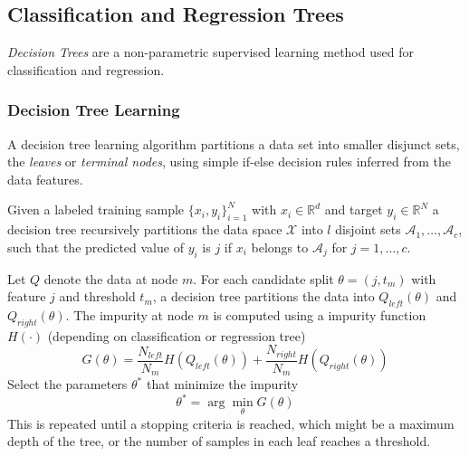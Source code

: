 \documentclass[11pt]{article}
\theoremstyle{plain}
\theoremstyle{definition}
\begin{document}
\subsection{Classification and Regression Trees}
\textit{Decision Trees} are a non-parametric supervised learning method used for classification and regression. 

\subsubsection{Decision Tree Learning}
A decision tree learning algorithm partitions a data set into smaller disjunct sets, the \textit{leaves} or \textit{terminal nodes}, using simple if-else decision rules inferred from the data features.

Given a labeled training sample $\{x_i,y_i\}_{i=1}^N$ with $x_i \in \mathbb{R}^d$ and target $y_i \in \mathbb{R}^N$ a decision tree recursively partitions the data space $\mathcal{X}$ into $l$ disjoint sets $\mathcal{A}_1, \dots,\mathcal{A}_c$, such that the predicted value of $y_i$ is $j$ if $x_i$ belongs to $\mathcal{A}_j$ for $j = 1, \dots, c$.

Let $Q$ denote the data at node $m$. For each candidate split $\theta=(j,t_m)$ with feature $j$ and threshold $t_m$, a decision tree partitions the data into $Q_{left}(\theta)$ and $Q_{right}(\theta)$. The impurity at node $m$ is computed using a impurity function $H(\cdot)$ (depending on classification or regression tree)
\begin{equation}
G(\theta) = \frac{N_{left}}{N_m}H(Q_{left}(\theta)) + \frac{N_{right}}{N_m}H(Q_{right}(\theta)) 
\end{equation}
Select the parameters $\theta^*$ that minimize the impurity
\begin{equation}
\theta^* = \arg\min_\theta G(\theta)
\end{equation}
This is repeated until a stopping criteria is reached, which might be a maximum depth of the tree, or the number of samples in each leaf reaches a threshold.
\end{document}
